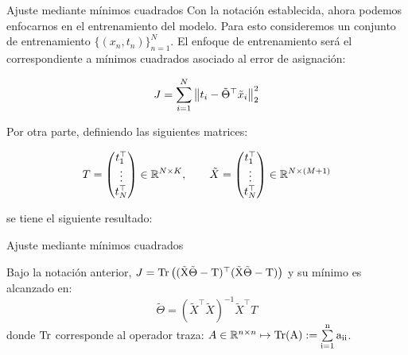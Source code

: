 \documentclass[9pt]{beamer}
\begin{document}
\begin{frame}{Ajuste mediante mínimos cuadrados}
Con la notación establecida, ahora podemos enfocarnos en el entrenamiento del modelo.  Para esto consideremos un conjunto de entrenamiento $\{(x_n,t_n)\}_{n=1}^N$. El enfoque de entrenamiento será el correspondiente a mínimos cuadrados asociado al error de asignación:

\begin{equation*}
  J = \sum_{i=1}^N \left\lVert t_i - \tilde{\Theta}^\top\tilde{x}_i\right\rVert_2^2
\end{equation*}  \pause

Por otra parte, definiendo las siguientes matrices:

\begin{equation*}
  T = \left(\begin{matrix}
    t_1^\top\\
    \vdots\\
    t_N^\top
  \end{matrix}\right)\in\mathbb{R}^{N\times K},\qquad
  \tilde{X} = \left(\begin{matrix}
    t_1^\top\\
    \vdots\\
    t_N^\top
  \end{matrix}\right)\in\mathbb{R}^{N\times (M+1)}
\end{equation*}

\pause

se tiene el siguiente resultado:

\end{frame}

\begin{frame}{Ajuste mediante mínimos cuadrados}

\begin{lemma}
  Bajo la notación anterior, $J=\operatorfont{Tr} \left((\tX\tilde{\Theta}-T)^\top (\tX\tilde{\Theta}-T)\right)$ y su mínimo es alcanzado en: 
  \begin{equation*}
    \tilde{\Theta} = (\tilde{X}^\top\tilde{X})^{-1}\tilde{X}^\top T
  \end{equation*}
  donde $\operatorfont{Tr}$ corresponde al operador traza: $A\in\R^{n\times n}\mapsto \operatorfont{Tr}(A):=\sum\limits_{i=1}^n a_{ii}$.
\end{lemma}


\end{frame}
\end{document}
